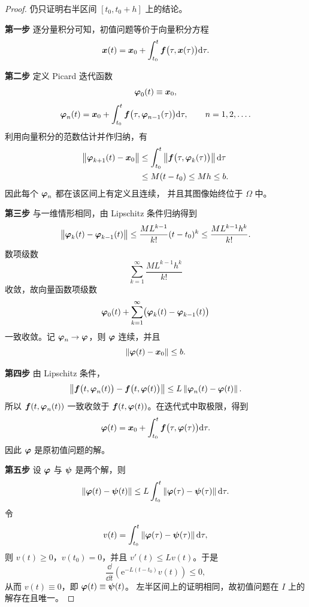 \begin{proof}
	仍只证明右半区间 $[t_0,t_0+h]$ 上的结论。

	\noindent\textbf{第一步}\quad
	逐分量积分可知，初值问题等价于向量积分方程
	\[
		\boldsymbol{x}(t)
		=\boldsymbol{x}_0
		+\int_{t_0}^{t}
		\boldsymbol{f}\bigl(\tau,\boldsymbol{x}(\tau)\bigr)\mathrm{d}\tau.
	\]

	\noindent\textbf{第二步}\quad
	定义 Picard 迭代函数
	\[
		\boldsymbol{\varphi}_0(t)\equiv\boldsymbol{x}_0,
	\]
	\[
		\boldsymbol{\varphi}_n(t)
		=\boldsymbol{x}_0
		+\int_{t_0}^{t}
		\boldsymbol{f}\bigl(\tau,\boldsymbol{\varphi}_{n-1}(\tau)\bigr)\mathrm{d}\tau,
		\qquad n=1,2,\ldots.
	\]
	利用向量积分的范数估计并作归纳，有
	\[
		\begin{aligned}
			\left\| \boldsymbol{\varphi}_{k+1}(t)-\boldsymbol{x}_0 \right\|
			&\leq
			\int_{t_0}^{t}
			\left\| 
				\boldsymbol{f}\bigl(\tau,\boldsymbol{\varphi}_k(\tau)\bigr)
			 \right\|\mathrm{d}\tau\\
			&\leq M(t-t_0)
			\leq Mh
			\leq b.
		\end{aligned}
	\]
	因此每个 $\boldsymbol{\varphi}_n$ 都在该区间上有定义且连续，
	并且其图像始终位于 $\Omega$ 中。

	\noindent\textbf{第三步}\quad
	与一维情形相同，由 Lipschitz 条件归纳得到
	\[
		\left\| 
			\boldsymbol{\varphi}_k(t)-\boldsymbol{\varphi}_{k-1}(t)
		 \right\|
		\leq
		\dfrac{ML^{k-1}}{k!}(t-t_0)^k
		\leq
		\dfrac{ML^{k-1}h^k}{k!}.
	\]
	数项级数
	\[
		\sum_{k=1}^{\infty}
		\dfrac{ML^{k-1}h^k}{k!}
	\]
	收敛，故向量函数项级数
	\[
		\boldsymbol{\varphi}_0(t)
		+\sum_{k=1}^{\infty}
		\bigl(
			\boldsymbol{\varphi}_k(t)-\boldsymbol{\varphi}_{k-1}(t)
		\bigr)
	\]
	一致收敛。记 $\boldsymbol{\varphi}_n\to\boldsymbol{\varphi}$，则
	$\boldsymbol{\varphi}$ 连续，并且
	\[
		\left\| \boldsymbol{\varphi}(t)-\boldsymbol{x}_0 \right\|\leq b.
	\]

	\noindent\textbf{第四步}\quad
	由 Lipschitz 条件，
	\[
		\left\| 
			\boldsymbol{f}\bigl(t,\boldsymbol{\varphi}_n(t)\bigr)
			-\boldsymbol{f}\bigl(t,\boldsymbol{\varphi}(t)\bigr)
		 \right\|
		\leq
		L\left\| \boldsymbol{\varphi}_n(t)-\boldsymbol{\varphi}(t) \right\|.
	\]
	所以
	$\boldsymbol{f}(t,\boldsymbol{\varphi}_n(t))$
	一致收敛于
	$\boldsymbol{f}(t,\boldsymbol{\varphi}(t))$。在迭代式中取极限，得到
	\[
		\boldsymbol{\varphi}(t)
		=\boldsymbol{x}_0
		+\int_{t_0}^{t}
		\boldsymbol{f}\bigl(\tau,\boldsymbol{\varphi}(\tau)\bigr)\mathrm{d}\tau.
	\]
	因此 $\boldsymbol{\varphi}$ 是原初值问题的解。

	\noindent\textbf{第五步}\quad
	设 $\boldsymbol{\varphi}$ 与 $\boldsymbol{\psi}$ 是两个解，则
	\[
		\left\| \boldsymbol{\varphi}(t)-\boldsymbol{\psi}(t) \right\|
		\leq
		L\int_{t_0}^{t}
		\left\| \boldsymbol{\varphi}(\tau)-\boldsymbol{\psi}(\tau) \right\|\mathrm{d}\tau.
	\]
	令
	\[
		v(t)=
		\int_{t_0}^{t}
		\left\| \boldsymbol{\varphi}(\tau)-\boldsymbol{\psi}(\tau) \right\|\mathrm{d}\tau,
	\]
	则 $v(t)\geq0$，$v(t_0)=0$，并且 $v'(t)\leq Lv(t)$。于是
	\[
		\dfrac{\dd}{\dd t}
		\left(\mathrm{e}^{-L(t-t_0)}v(t)\right)\leq0,
	\]
	从而 $v(t)\equiv0$，即
	$\boldsymbol{\varphi}(t)\equiv\boldsymbol{\psi}(t)$。
	左半区间上的证明相同，故初值问题在 $I$ 上的解存在且唯一。
\end{proof}

